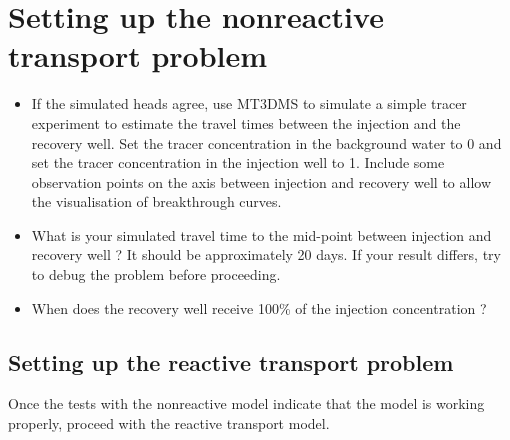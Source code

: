 \section[Setting up the nonreactive transport problem]{Setting up the nonreactive transport problem}

\begin{itemize}

\item If the simulated heads agree, use MT3DMS to simulate a simple tracer experiment
to estimate the travel times between the injection and the recovery well. 
Set the tracer concentration in the background water to 0 and set the tracer concentration
in the injection well to 1. Include some observation points on the axis between injection and recovery well to allow the visualisation
of breakthrough curves.

\item What is your simulated travel time to the mid-point between 
injection and recovery well ? It should be approximately 20 days.
If your result differs, try to debug the problem before proceeding.

\item When does the recovery well receive 100\% of the injection concentration ? 

\end{itemize} 

\subsection[Setting up the reactive transport problem]{Setting up the reactive transport problem}

Once the tests with the nonreactive model indicate that the model is working properly,
proceed with the reactive transport model. 

